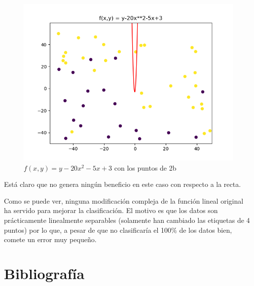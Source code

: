 \begin{itemize}
\begin{figure}[H] %
	\centering
	\includegraphics[scale=0.5]{f4.png}  %
	\caption{$f(x,y) =  y -20x^2-5x+3$ con los puntos de 2b} 
	\label{fig:f4}
\end{figure}

Está claro que no genera ningún beneficio en este caso con respecto a la recta.

\end{itemize}

Como se puede ver, ninguna modificación compleja de la función lineal original ha servido para mejorar la clasificación. El motivo es que los datos son prácticamente linealmente separables (solamente han cambiado las etiquetas de 4 puntos) por lo que, a pesar de que no clasificaría el 100\% de los datos bien, comete un error muy pequeño.

\newpage
\section{Bibliografía}




